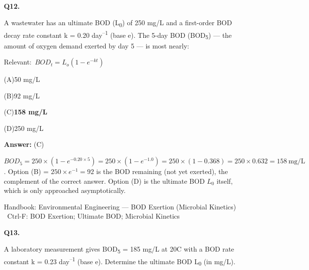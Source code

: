 \documentclass[11pt]{article}
\newcommand{\correct}[1]{\textbf{#1}\;{\color{accent}$\checkmark$}}
\newcommand{\optline}[2]{\par\noindent\hspace{1.2em}(#1)\hspace{0.6em}#2}
\begin{document}
\vspace{9pt}
\filbreak
\textbf{\color{accent}Q12.}\par\vspace{2pt}
A wastewater has an ultimate BOD (L\textsubscript{0}) of 250 mg/L and a first-order BOD decay rate constant k = 0.20 day\textsuperscript{--}\textsuperscript{1} (base e). The 5-day BOD (BOD\textsubscript{5}) --- the amount of oxygen demand exerted by day 5 --- is most nearly:\par\vspace{3pt}
{\small\color{soft}Relevant:}\ $BOD_t = L_o\left(1 - e^{-kt}\right)$\par\vspace{3pt}
\optline{A}{50 mg/L}
\optline{B}{92 mg/L}
\optline{C}{\correct{158 mg/L}}
\optline{D}{250 mg/L}
\par\vspace{3pt}
\vspace{2pt}\par\noindent\colorbox{boxbg}{\parbox{\dimexpr\linewidth-2\fboxsep\relax}{%
\vspace{2pt}\textbf{Answer:} (C)\par\vspace{2pt}
{\small $BOD_5 = 250\times(1-e^{-0.20\times5}) = 250\times(1-e^{-1.0}) = 250\times(1-0.368) = 250\times0.632 = 158\ \mathrm{mg/L}$. Option (B) = $250\times e^{-1} = 92$ is the BOD remaining (not yet exerted), the complement of the correct answer. Option (D) is the ultimate BOD $L_0$ itself, which is only approached asymptotically.}\par\vspace{2pt}
{\footnotesize\color{soft}Handbook: Environmental Engineering --- BOD Exertion (Microbial Kinetics) \textbullet\ Ctrl-F: BOD Exertion; Ultimate BOD; Microbial Kinetics}\vspace{2pt}
}}
\vspace{9pt}
\filbreak
\textbf{\color{accent}Q13.}\par\vspace{2pt}
A laboratory measurement gives BOD\textsubscript{5} = 185 mg/L at 20\textdegree{}C with a BOD rate constant k = 0.23 day\textsuperscript{--}\textsuperscript{1} (base e). Determine the ultimate BOD L\textsubscript{0} (in mg/L).\par\vspace{3pt}
\end{document}
